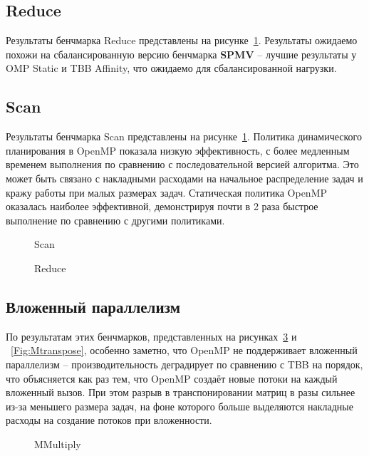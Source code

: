\documentclass[times,specification,annotation]{itmo-student-thesis}
\begin{document}
\subsection{Reduce}
Результаты бенчмарка Reduce представлены на рисунке~\ref{Fig:Scan}. Результаты ожидаемо похожи на сбалансированную версию бенчмарка \textbf{SPMV} -- лучшие результаты у OMP Static и TBB Affinity, что ожидаемо для сбалансированной нагрузки.

\subsection{Scan}
Результаты бенчмарка Scan представлены на рисунке~\ref{Fig:Scan}.
Политика динамического планирования в OpenMP показала низкую эффективность, с более медленным временем выполнения по сравнению с последовательной версией алгоритма.
Это может быть связано с накладными расходами на начальное распределение задач и кражу работы при малых размерах задач.
Статическая политика OpenMP оказалась наиболее эффективной, демонстрируя почти в 2 раза быстрое выполнение по сравнению с другими политиками.


\begin{figure}[!htb]
    \centering
        
    \caption{Scan}\label{Fig:Scan}
\end{figure}

\begin{figure}[!htb]
    \centering
        
    \caption{Reduce}\label{Fig:Reduce}
\end{figure}

\subsection{Вложенный параллелизм}
По результатам этих бенчмарков, представленных на рисунках~\ref{Fig:Mmul} и ~\ref{Fig:Mtranspose}, особенно заметно, что OpenMP не поддерживает вложенный параллелизм -- производительность деградирует по сравнению с TBB на порядок, что объясняется как раз тем, что OpenMP создаёт новые потоки на каждый вложенный вызов. При этом разрыв в транспонировании матриц в разы сильнее из-за  меньшего размера задач, на фоне которого больше выделяются накладные расходы на создание потоков при вложенности.
\begin{figure}[!htb]
    \centering
        
    \caption{MMultiply}\label{Fig:Mmul}
\end{figure}
\end{document}
